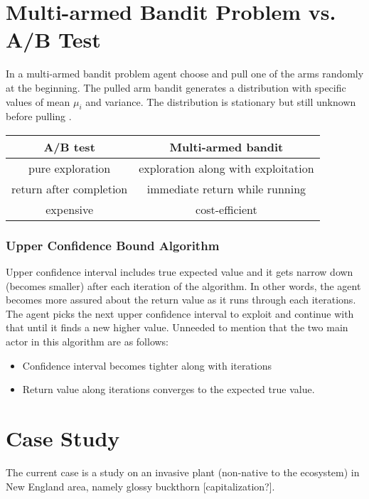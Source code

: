 \documentclass[a4paper,12pt]{article}
\begin{document}

\section{Multi-armed Bandit Problem vs. A/B Test}
In a multi-armed bandit problem agent choose and pull one of the arms randomly at the beginning. The pulled arm bandit generates a distribution with specific values of mean $\mu_i$ and variance. The distribution is stationary but still unknown before pulling \cite{Strehl2008}.

\begin{tabular}{|c|c|}
    \hline
    \textbf{A/B test}    &   \textbf{Multi-armed bandit}  \\
    \hline
    \hline
    pure exploration    &   exploration along with exploitation \\
    \hline
    return after completion &   immediate return while running \\
    \hline
    expensive   &   cost-efficient \\
    \hline
\end{tabular}

\subsubsection{Upper Confidence Bound Algorithm}
Upper confidence interval includes true expected value and it gets narrow down (becomes smaller) after each iteration of the algorithm. In other words, the agent becomes more assured about the return value as it runs through each iterations. The agent picks the next upper confidence interval to exploit and continue with that until it finds a new higher value. Unneeded to mention that the two main actor in this algorithm are as follows:
\begin{itemize}
    \item Confidence interval becomes tighter along with iterations
    \item Return value along iterations converges to the expected true value.
\end{itemize}


\section{Case Study}
The current case is a study on an invasive plant (non-native to the ecosystem) in New England area, namely glossy buckthorn [capitalization?].
\end{document}
